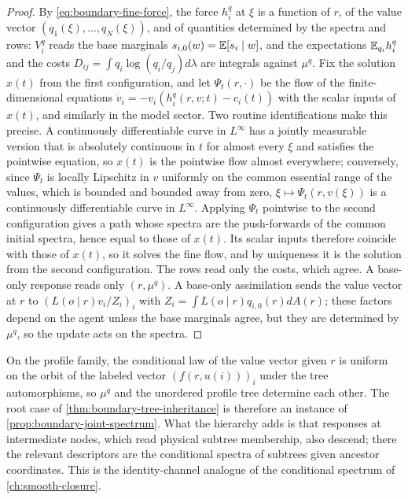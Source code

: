 \begin{proof}
By \cref{eq:boundary-fine-force}, the force $h_i^q$ at $\xi$ is a function of $r$, of the value vector $(q_1(\xi),\ldots,q_N(\xi))$, and of quantities determined by the spectra and rows: $V_i^q$ reads the base marginals $s_{i,0}(w)=\mathbb E[s_i\mid w]$, and the expectations $\mathbb E_{q_i}h_i^q$ and the costs $D_{ij}=\int q_i\log(q_i/q_j)d\lambda$ are integrals against $\mu^q$. Fix the solution $x(t)$ from the first configuration, and let $\Psi_t(r,\cdot)$ be the flow of the finite-dimensional equations $\dot v_i=-v_i(h_i^q(r,v;t)-c_i(t))$ with the scalar inputs of $x(t)$, and similarly in the model sector. Two routine identifications make this precise. A continuously differentiable curve in $L^\infty$ has a jointly measurable version that is absolutely continuous in $t$ for almost every $\xi$ and satisfies the pointwise equation, so $x(t)$ is the pointwise flow almost everywhere; conversely, since $\Psi_t$ is locally Lipschitz in $v$ uniformly on the common essential range of the values, which is bounded and bounded away from zero, $\xi\mapsto\Psi_t(r,v(\xi))$ is a continuously differentiable curve in $L^\infty$. Applying $\Psi_t$ pointwise to the second configuration gives a path whose spectra are the push-forwards of the common initial spectra, hence equal to those of $x(t)$. Its scalar inputs therefore coincide with those of $x(t)$, so it solves the fine flow, and by uniqueness it is the solution from the second configuration. The rows read only the costs, which agree. A base-only response reads only $(r,\mu^q)$. A base-only assimilation sends the value vector at $r$ to $(L(o\mid r)v_i/Z_i)_i$ with $Z_i=\int L(o\mid r)q_{i,0}(r)dA(r)$; these factors depend on the agent unless the base marginals agree, but they are determined by $\mu^q$, so the update acts on the spectra.
\end{proof}

On the profile family, the conditional law of the value vector given $r$ is uniform on the orbit of the labeled vector $(f(r,u(i)))_i$ under the tree automorphisms, so $\mu^q$ and the unordered profile tree determine each other. The root case of \cref{thm:boundary-tree-inheritance} is therefore an instance of \cref{prop:boundary-joint-spectrum}. What the hierarchy adds is that responses at intermediate nodes, which read physical subtree membership, also descend; there the relevant descriptors are the conditional spectra of subtrees given ancestor coordinates. This is the identity-channel analogue of the conditional spectrum of \cref{ch:smooth-closure}.

